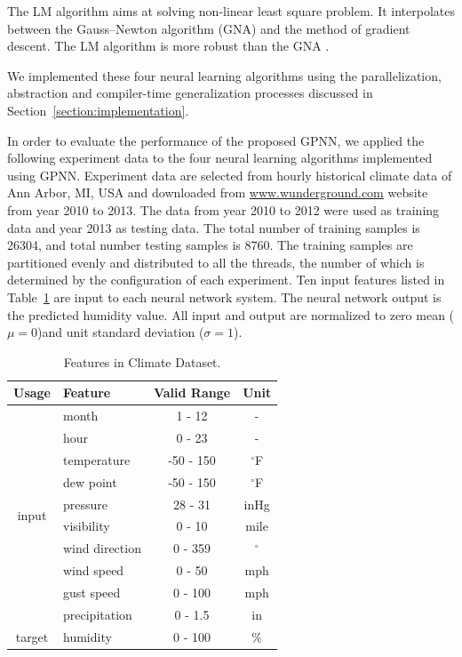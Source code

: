 \documentclass[procedia]{easychair}
\begin{document}
The LM algorithm aims at solving non-linear least square problem.  It interpolates between the Gauss–Newton algorithm (GNA) and the method of gradient descent. The LM algorithm is more robust than the GNA \cite{hagan1994training}.

We implemented these four neural learning algorithms using the parallelization, abstraction and compiler-time generalization processes discussed in Section~\ref{section:implementation}.

In order to evaluate the performance of the proposed GPNN, we applied the following experiment data to the four neural learning algorithms implemented using GPNN. Experiment data are selected from hourly historical climate data of Ann Arbor, MI, USA and downloaded from \url{www.wunderground.com} website from year 2010 to 2013.  The data from year 2010 to 2012 were used as training data and year 2013 as testing data.  The total number of training samples is 26304, and total number testing samples is 8760.  The training samples are partitioned evenly and distributed to all the threads, the number of which is determined by the configuration of each experiment.  Ten input features listed in Table~\ref{table:climate} are input to each neural network system.  The neural network output is the predicted humidity value.  All input and output are normalized to zero mean ($ \mu = 0 $)and unit standard deviation ($ \sigma = 1 $).

\begin{table}[htp]
    \centering
    \caption{Features in Climate Dataset.}
    \begin{tabular}{ c l c c }
        \hline \hline
        Usage & Feature & Valid Range & Unit \\
        \hline
        \multirow{10}{*}{input}
            & month & 1 - 12 & - \\
            & hour & 0 - 23 & - \\
            & temperature & -50 - 150 & \(^\circ\)F \\
            & dew point & -50 - 150 & \(^\circ\)F \\
            & pressure & 28 - 31 & inHg \\
            & visibility & 0 - 10 & mile \\
            & wind direction & 0 - 359 & \(^\circ\) \\
            & wind speed & 0 - 50 & mph \\
            & gust speed & 0 - 100 & mph \\
            & precipitation & 0 - 1.5 & in \\
        \hline
        target & humidity & 0 - 100 & \% \\
        \hline \hline
    \end{tabular}
    \label{table:climate}
\end{table}
\end{document}
